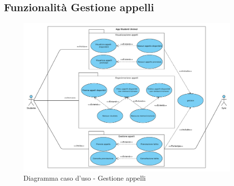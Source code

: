 \subsection{Funzionalità Gestione appelli}
\begin{figure}[h]
	\includegraphics[width=6.5in]{imgs/gruppo1/use_case_diagrams/UCD2-gestione_appelli.pdf}
	\caption{Diagramma caso d'uso - Gestione appelli}
	\label{diag:gestioneAppelli}
\end{figure}

\clearpage
